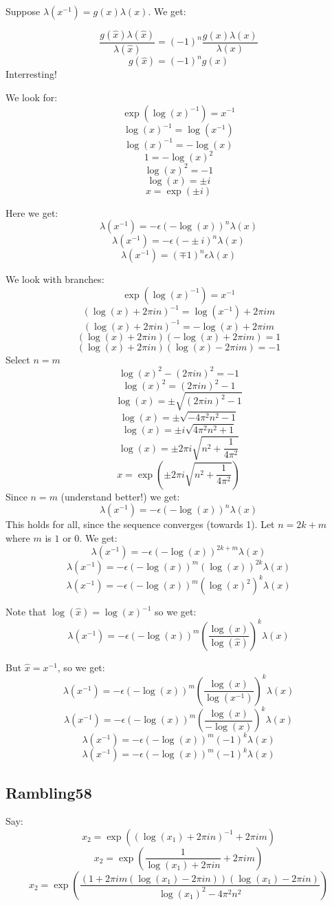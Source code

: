 \documentclass[a4paper]{amsart}
\begin{document}
Suppose $\lambda(x^{-1}) = g(x) \lambda(x)$. We get:

$$\frac{g(\hat{x})\lambda(\hat{x})}{\lambda(\hat{x})} = (-1)^n \frac{g(x)\lambda(x)}{\lambda(x)}$$
$$g(\hat{x}) = (-1)^n g(x)$$
Interresting!

We look for: 
$$\exp(\log(x)^{-1}) = x^{-1}$$
$$\log(x)^{-1} = \log(x^{-1})$$
$$\log(x)^{-1} = -\log(x)$$
$$1 = -\log(x)^2$$
$$\log(x)^2 = -1$$
$$\log(x) = \pm i$$
$$x = \exp(\pm i)$$


Here we get:
$$\lambda(x^{-1}) = -\epsilon(-\log(x))^{n}\lambda(x)$$
$$\lambda(x^{-1}) = -\epsilon(-\pm i)^{n}\lambda(x)$$
$$\lambda(x^{-1}) = (\mp 1)^{n}\epsilon\lambda(x)$$

We look with branches:
$$\exp(\log(x)^{-1}) = x^{-1}$$
$$(\log(x) + 2\pi i n)^{-1} = \log(x^{-1}) + 2\pi i m$$
$$(\log(x) + 2\pi i n)^{-1} = -\log(x) + 2\pi i m$$
$$(\log(x) + 2\pi i n)(-\log(x) + 2\pi i m) = 1$$
$$(\log(x) + 2\pi i n)(\log(x) - 2\pi i m) = -1$$
Select $n = m$
$$\log(x)^2 - (2\pi i n)^2 = -1$$
$$\log(x)^2 = (2\pi i n)^2 - 1$$
$$\log(x) = \pm \sqrt{(2\pi i n)^2 - 1}$$
$$\log(x) = \pm \sqrt{-4\pi^2 n^2 - 1}$$
$$\log(x) = \pm i\sqrt{4\pi^2 n^2 + 1}$$
$$\log(x) = \pm 2\pi i \sqrt{n^2 + \frac{1}{4\pi^2}}$$
$$x = \exp(\pm 2\pi i \sqrt{n^2 + \frac{1}{4\pi^2}})$$
Since $n = m$ (understand better!) we get:
$$\lambda(x^{-1}) = -\epsilon(-\log(x))^{n}\lambda(x)$$
This holds for all, since the sequence converges (towards 1). 
Let $n = 2k + m$ where $m$ is $1$ or $0$. We get:
$$\lambda(x^{-1}) = -\epsilon(-\log(x))^{2k + m}\lambda(x)$$
$$\lambda(x^{-1}) = -\epsilon(-\log(x))^{m}(\log(x))^{2k}\lambda(x)$$
$$\lambda(x^{-1}) = -\epsilon(-\log(x))^{m}(\log(x)^2)^{k}\lambda(x)$$

Note that $\log(\hat{x}) = \log(x)^{-1}$ so we get:
$$\lambda(x^{-1}) = -\epsilon(-\log(x))^{m}(\frac{\log(x)}{\log(\hat{x})})^{k}\lambda(x)$$

But $\hat{x} = x^{-1}$, so we get:
$$\lambda(x^{-1}) = -\epsilon(-\log(x))^{m}(\frac{\log(x)}{\log(x^{-1})})^{k}\lambda(x)$$
$$\lambda(x^{-1}) = -\epsilon(-\log(x))^{m}(\frac{\log(x)}{-\log(x)})^{k}\lambda(x)$$
$$\lambda(x^{-1}) = -\epsilon(-\log(x))^{m}(-1)^{k}\lambda(x)$$
$$\lambda(x^{-1}) = -\epsilon(-\log(x))^{m}(-1)^{k}\lambda(x)$$


\subsection{Rambling58}


Say: 
$$x_2 = \exp((\log(x_1) + 2\pi i n)^{-1} + 2\pi i m)$$
$$x_2 = \exp(\frac{1}{\log(x_1) + 2\pi i n} + 2\pi i m)$$
$$x_2 = \exp(\frac{(1 + 2\pi i m(\log(x_1) - 2\pi i n))(\log(x_1) - 2\pi i n)}{\log(x_1)^2 - 4\pi^2 n^2})$$
\end{document}
